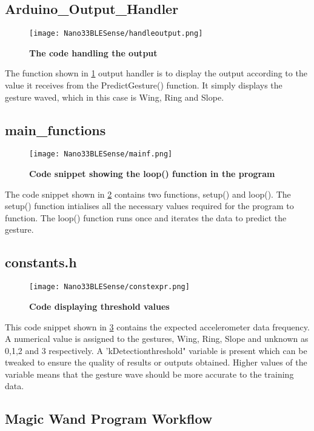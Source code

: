 \subsection{Arduino\_Output\_Handler} 

\begin{figure}[h!]
    \texttt{[image: Nano33BLESense/handleoutput.png]}
    \caption{\textbf{The code handling the output}}
    \label{op}
\end{figure}

The function shown in \ref{op}  output handler is to display the output according to the value it receives from the PredictGesture() function. It simply displays the gesture waved, which in this case is Wing, Ring and Slope. 

\subsection{main\_functions} 

\begin{figure}[h!]
    \texttt{[image: Nano33BLESense/mainf.png]}
    \caption{\textbf{Code snippet showing the loop() function in the program}}
    \label{mainf}
\end{figure}
The code snippet shown in \ref{mainf} contains two functions, setup() and loop(). The setup() function intialises all the necessary values required for the program to function. The loop() function runs once and iterates the data to predict the gesture. 

\subsection{constants.h}


\begin{figure}[h!]
    \texttt{[image: Nano33BLESense/constexpr.png]}
    \caption{\textbf{Code displaying threshold values}}
    \label{constexpr}
\end{figure}

This code snippet shown in \ref{constexpr} contains the expected accelerometer data frequency. A numerical value is assigned to the gestures, Wing, Ring, Slope and unknown as 0,1,2 and 3 respectively. A 'kDetectionthreshold" variable is present which can be tweaked to ensure the quality of results or outputs obtained. Higher values of the variable means that the gesture wave should be more accurate to the training data.


\subsection{Magic Wand Program Workflow}



